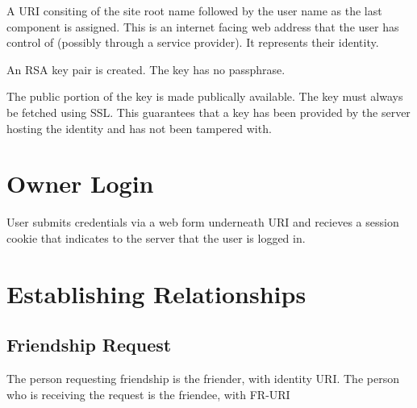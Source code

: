 \documentclass[letterpaper,11pt,oneside]{article}
\begin{document}
A URI consiting of the site root name followed by the user name as the last
component is assigned. This is an internet facing web address that the user has
control of (possibly through a service provider). It represents their identity.

An RSA key pair is created. The key has no passphrase. 

The public portion of the key is made publically available. The key must always
be fetched using SSL. This guarantees that a key has been provided by the
server hosting the identity and has not been tampered with.

\section{Owner Login}

User submits credentials via a web form underneath URI and recieves a session
cookie that indicates to the server that the user is logged in.

\section{Establishing Relationships}

\subsection{Friendship Request}

The person requesting friendship is the friender, with identity URI.
The person who is receiving the request is the friendee, with FR-URI
\end{document}
